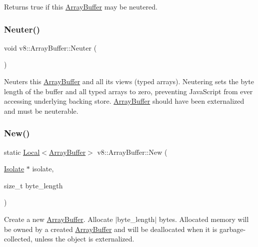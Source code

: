 Returns true if this \mbox{\hyperlink{classv8_1_1ArrayBuffer}{Array\+Buffer}} may be neutered. \mbox{\label{classv8_1_1ArrayBuffer_a3420f7d38a8fe20e8f40fb82e6acb325}} 
\subsubsection{\texorpdfstring{Neuter()}{Neuter()}}
{\footnotesize\ttfamily void v8\+::\+Array\+Buffer\+::\+Neuter (\begin{DoxyParamCaption}{ }\end{DoxyParamCaption})}

Neuters this \mbox{\hyperlink{classv8_1_1ArrayBuffer}{Array\+Buffer}} and all its views (typed arrays). Neutering sets the byte length of the buffer and all typed arrays to zero, preventing Java\+Script from ever accessing underlying backing store. \mbox{\hyperlink{classv8_1_1ArrayBuffer}{Array\+Buffer}} should have been externalized and must be neuterable. \mbox{\label{classv8_1_1ArrayBuffer_ad752e03d7cc7fe863656ad6183785ab7}} 
\subsubsection{\texorpdfstring{New()}{New()}\hspace{0.1cm}{\footnotesize\ttfamily [1/2]}}
{\footnotesize\ttfamily static \mbox{\hyperlink{classv8_1_1Local}{Local}}$<$\mbox{\hyperlink{classv8_1_1ArrayBuffer}{Array\+Buffer}}$>$ v8\+::\+Array\+Buffer\+::\+New (\begin{DoxyParamCaption}\item[{\mbox{\hyperlink{classv8_1_1Isolate}{Isolate}} $\ast$}]{isolate,  }\item[{size\+\_\+t}]{byte\+\_\+length }\end{DoxyParamCaption})\hspace{0.3cm}{\ttfamily [static]}}

Create a new \mbox{\hyperlink{classv8_1_1ArrayBuffer}{Array\+Buffer}}. Allocate $\vert$byte\+\_\+length$\vert$ bytes. Allocated memory will be owned by a created \mbox{\hyperlink{classv8_1_1ArrayBuffer}{Array\+Buffer}} and will be deallocated when it is garbage-\/collected, unless the object is externalized. \mbox{\label{classv8_1_1ArrayBuffer_acc65e714766b0d0d791b0d43ec52d0bb}} 
